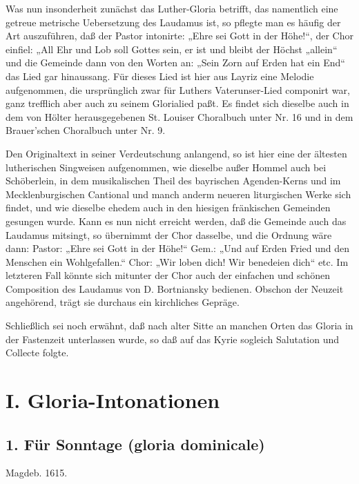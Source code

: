 Was nun insonderheit zunächst das Luther-Gloria betrifft, das namentlich eine getreue metrische Uebersetzung des Laudamus ist, so pflegte man es häufig der Art auszuführen, daß der Pastor intonirte: „Ehre sei Gott in der Höhe!“, der Chor einfiel: „All Ehr und Lob soll Gottes sein, er ist und bleibt der Höchst
„allein“ und die Gemeinde dann von den Worten an: „Sein Zorn auf Erden hat ein End“ das Lied gar hinaussang. Für dieses Lied ist hier aus Layriz eine Melodie aufgenommen, die ursprünglich zwar für Luthers Vaterunser-Lied componirt war, ganz trefflich aber auch zu seinem Glorialied paßt. Es findet sich dieselbe auch in dem von Hölter herausgegebenen St. Louiser Choralbuch unter Nr. 16 und in dem Brauer’schen Choralbuch unter Nr. 9.

Den Originaltext in seiner Verdeutschung anlangend, so ist hier eine der ältesten lutherischen Singweisen aufgenommen, wie dieselbe außer Hommel auch bei Schöberlein, in dem musikalischen Theil des bayrischen Agenden-Kerns und im Mecklenburgischen Cantional und manch anderm neueren liturgischen Werke sich findet, und wie dieselbe ehedem auch in den hiesigen fränkischen Gemeinden gesungen wurde. Kann es nun nicht erreicht werden, daß die Gemeinde auch das Laudamus mitsingt, so übernimmt der Chor dasselbe, und die Ordnung wäre dann: Pastor: „Ehre sei Gott in der Höhe!“ Gem.: „Und auf Erden Fried und den Menschen ein Wohlgefallen.“ Chor: „Wir loben dich! Wir benedeien dich“ etc. Im letzteren Fall könnte sich mitunter der Chor auch der einfachen und schönen Composition des Laudamus von D. Bortniansky bedienen. Obschon der Neuzeit angehörend, trägt sie durchaus ein kirchliches Gepräge.

Schließlich sei noch erwähnt, daß nach alter Sitte an manchen Orten das Gloria in der Fastenzeit unterlassen wurde, so daß auf das Kyrie sogleich Salutation und Collecte folgte.

\section{I. Gloria-Intonationen}

\subsection{1. Für Sonntage (gloria dominicale)}

Magdeb. 1615.


